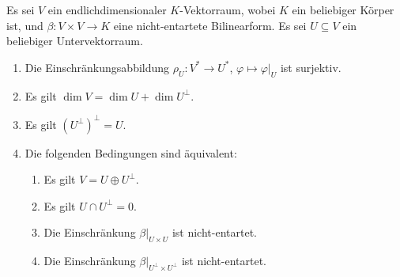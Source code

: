 \documentclass[a4paper,10pt,numbers=noenddot]{scrartcl}
\begin{document}
\begin{proposition}\label{prop: orthogonal decomposition for nondegenerate symmetric forms}
  Es sei $V$ ein endlichdimensionaler $K$-Vektorraum, wobei $K$ ein beliebiger Körper ist, und $\beta \colon V \times V \to K$ eine nicht-entartete Bilinearform.
  Es sei $U \subseteq V$ ein beliebiger Untervektorraum.
  \begin{enumerate}[leftmargin=*]
    \item
      Die Einschränkungsabbildung $\rho_U \colon V^* \to U^*$, $\varphi \mapsto \varphi|_U$ ist surjektiv.
    \item
      Es gilt $\dim V = \dim U + \dim U^\perp$.
    \item
      Es gilt $(U^\perp)^\perp = U$.
    \item
      Die folgenden Bedingungen sind äquivalent:
      \begin{enumerate}
        \item
          Es gilt $V = U \oplus U^\perp$.
        \item
          Es gilt $U \cap U^\perp = 0$.
        \item
          Die Einschränkung $\beta|_{U \times U}$ ist nicht-entartet.
        \item
          Die Einschränkung $\beta|_{U^\perp \times U^\perp}$ ist nicht-entartet.
      \end{enumerate}
  \end{enumerate}
\end{proposition}
\end{document}

